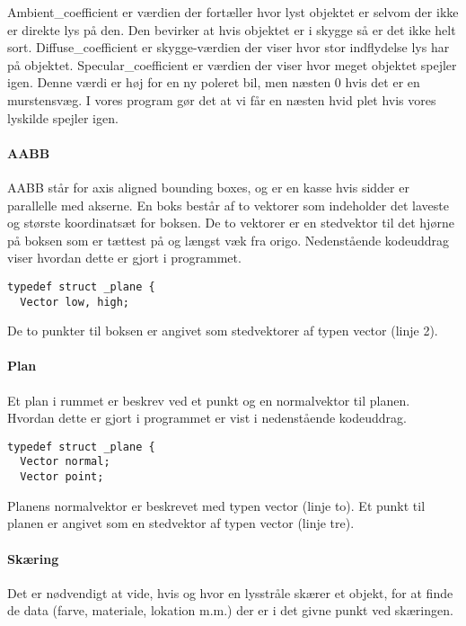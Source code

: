 Ambient\_coefficient er værdien der fortæller hvor lyst objektet er selvom der ikke er direkte lys på den. Den bevirker at hvis objektet er i skygge så er det ikke helt sort.
Diffuse_coefficient er skygge-værdien der viser hvor stor indflydelse lys har på objektet. 
Specular\_coefficient er værdien der viser hvor meget objektet spejler igen. Denne værdi er høj for en ny poleret bil, men næsten 0 hvis det er en murstensvæg. I vores program gør det at vi får en næsten hvid plet hvis vores lyskilde spejler igen.

\paragraph{AABB}
AABB står for axis aligned bounding boxes, og er en kasse hvis sidder er parallelle med akserne. En boks består af to vektorer som indeholder det laveste og største koordinatsæt for boksen. De to vektorer er en stedvektor til det hjørne på boksen som er tættest på og længst væk fra origo. Nedenstående kodeuddrag viser hvordan dette er gjort i programmet.

\begin{lstlisting}[style=Cstyle, caption=Struct til bounding boxes]
typedef struct _plane {
  Vector low, high;
\end{lstlisting}

De to punkter til boksen er angivet som stedvektorer af typen vector (linje 2).

\paragraph{Plan}
Et plan i rummet er beskrev ved et punkt og en normalvektor til planen. Hvordan dette er gjort i programmet er vist i nedenstående kodeuddrag. 

\begin{lstlisting}[style=Cstyle, caption=Struct til plan]
typedef struct _plane {
  Vector normal;
  Vector point;
\end{lstlisting}

Planens normalvektor er beskrevet med typen vector (linje to). Et punkt til planen er angivet som en stedvektor af typen vector (linje tre).

\paragraph{Skæring}
Det er nødvendigt at vide, hvis og hvor en lysstråle skærer et objekt, for at finde de data (farve, materiale, lokation m.m.) der er i det givne punkt ved skæringen.

